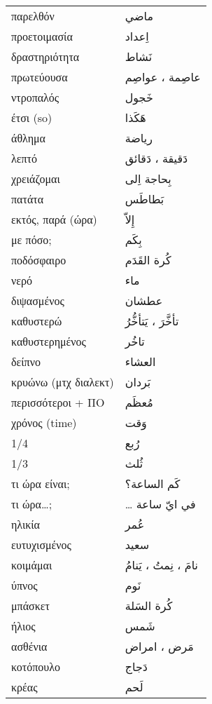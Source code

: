 \documentclass[twocolumn,a4paper]{article}
\newcommand{\ar}[1]{\textarabic{#1}}
\newcommand{\pl}{\raisebox{0.15ex}{\footnotesize ◍}}
\newcommand{\vrf}{\raisebox{0.15ex}{\footnotesize ◉}}
\newcommand{\vr}{\raisebox{0.15ex}{\footnotesize ◎}}
\newcommand{\mas}{\raisebox{0.15ex}{\footnotesize ◫}}
\begin{document}
\begin{mpsupertabular}{ P{0.5\textwidth} P{0.5\textwidth} }
παρελθόν       & \ar{ ماضي } \\
προετοιμασία   & \ar{ اِعداد } \\
δραστηριότητα  & \ar{ نَشاط  } \\
πρωτεύουσα \pl & \ar{ عاصِمة ، عواصِم } \\
ντροπαλός      & \ar{ خَجول } \\
έτσι (so)      & \ar{ هَكَذا } \\
άθλημα         & \ar{ رياضة } \\

λεπτό \pl                    & \ar{ دَقيقة ، دَقائق } \\
χρειάζομαι \vr               & \ar{ بِحاجة اِلى } \\
πατάτα                       & \ar{ بَطاطَس } \\
εκτός, παρά (ώρα)            & \ar{ إِلاّ } \\
με πόσο;                     & \ar{ بِكَم } \\

ποδόσφαιρο                   & \ar{ كُرة القَدَم } \\
νερό                         & \ar{ ماء } \\
διψασμένος                   & \ar{ عطشان } \\
καθυστερώ \vrf               & \ar{ تأخَّرَ ، يَتأخُّرُ } \\
καθυστερημένος \mas          & \ar{ تاخُر } \\
δείπνο                       & \ar{ العشاء } \\
κρυώνω (μτχ διαλεκτ)         & \ar{ بَردان } \\
περισσότεροι + ΠΟ            & \ar{ مُعظَم } \\
χρόνος (time)                & \ar{ وَقت } \\
1/4                          & \ar{ رُبع } \\
1/3                          & \ar{ ثُلث } \\
τι ώρα είναι;                & \ar{ كَم الساعة؟ } \\
τι ώρα\dots ;                & \dots \ar{ في ايّ ساعة } \\

ηλικία                       & \ar{ عُمر } \\
ευτυχισμένος                 & \ar{ سعيد } \\
κοιμάμαι \vrf                & \ar{ نامَ ، نِمتُ ، يَنامُ } \\
ύπνος \mas                   & \ar{ نَوم } \\
μπάσκετ                      & \ar{ كُرة السَلة } \\
ήλιος                        & \ar{ شَمس } \\
ασθένια \pl                  & \ar{ مَرض ، امراض } \\
κοτόπουλο                    & \ar{ دَجاج } \\
κρέας                        & \ar{ لَحم } \\


\end{mpsupertabular}
\end{document}
